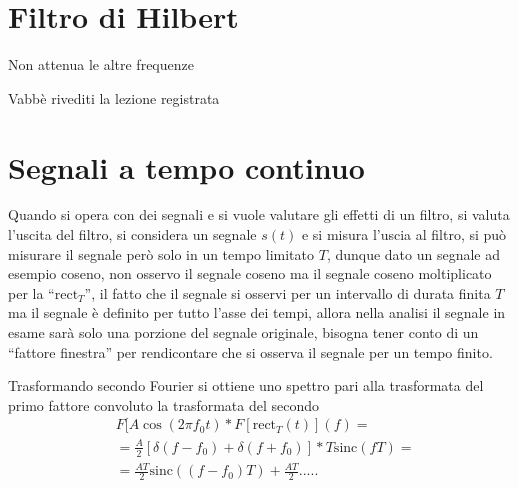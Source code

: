 
\section{Filtro di Hilbert}
Non attenua le altre frequenze



Vabbè rivediti la lezione registrata


\section{Segnali a tempo continuo}
Quando si opera con dei segnali e si vuole valutare gli effetti di un filtro,
si valuta l'uscita del filtro, si considera un segnale $s(t)$ e si misura
l'uscia al filtro, si può misurare il segnale però solo in un tempo limitato
$T$, dunque dato un segnale ad esempio coseno, non osservo il segnale coseno ma
il segnale coseno moltiplicato per la ``$\text{rect}_T$'', il fatto che il
segnale si osservi per un intervallo di durata finita $T$ ma il segnale è
definito per tutto l'asse dei tempi, allora nella analisi il segnale in esame
sarà solo una porzione del segnale originale, bisogna tener conto di un
``fattore finestra'' per rendicontare che si osserva il segnale per un tempo
finito.

Trasformando secondo Fourier si ottiene uno spettro pari alla trasformata del
primo fattore convoluto la trasformata del secondo
$$\begin{aligned}
&F[A\cos(2\pi f_0 t) \ast F[\text{rect}_T(t)](f) = \\
&=\frac{A}{2}[\delta(f-f_0) + \delta(f+f_0)] \ast T\text{sinc}(fT) = \\
&= \frac{AT}{2} \text{sinc}((f-f_0)T) + \frac{AT}{2} .....
\end{aligned}$$



